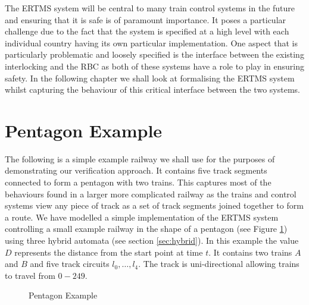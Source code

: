 \label{chap:hybrid}
The ERTMS system will be central to many train control systems in the future and ensuring that it is safe is of paramount importance. It poses a particular challenge due to the fact that the system is specified at a high level with each individual country having its own particular implementation. One aspect that is particularly problematic and loosely specified is the interface between the existing interlocking and the RBC as both of these systems have a role to play in ensuring safety. In the following chapter we shall look at formalising the ERTMS system whilst capturing the behaviour of this critical interface between the two systems. 
%
\section{Pentagon Example}
The following is a simple example railway we shall use for the purposes of demonstrating our verification approach.  It contains five track segments connected to form a pentagon with two trains. This captures most of the behaviours found in a larger more complicated railway as the trains and control systems view any piece of track as a set of track segments joined together to form a route. We have modelled  a simple implementation of the ERTMS system controlling  a small example railway in the shape of a pentagon (see Figure \ref{fig:pentagon2}) using three hybrid automata (see section \ref{sec:hybrid}). In this example the value $D$ represents the distance from the start point at time $t$. It contains two trains $A$ and $B$ and five track circuits $l_0, \ldots , l_4$. The track is uni-directional allowing trains to travel from $0 - 249$. 
\medskip
%
\begin{figure} [h!]
\begin{center}
\end{center}

 \caption{Pentagon Example}
 \label{fig:pentagon2}
\end{figure}

